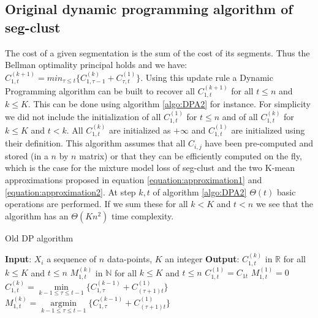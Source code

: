 \documentclass[article,10pt]{llncs}
\begin{document}

\subsection{Original dynamic programming algorithm of seg-clust}

The cost of a given segmentation is the sum of the cost of its segments. 
Thus the Bellman optimality principal holds and we have:
$ C_{1, t}^{(k+1)} = min_{\tau \leq t} \{ C_{1, \tau -1}^{(k)}  + C_{\tau, t}^{(1)} \} .$
Using this update rule  a Dynamic Programming algorithm can be built to recover all $ C_{1, t}^{(k+1)}$ for all $t \leq n$ and $k \leq K$.
This can be done using algorithm \ref{algo:DPA2} for instance. 
For simplicity we did not include the initialization of all $C^{(1)}_{1,t}$ for $t \leq n$ and of all $C^{(k)}_{1,t}$ for $k \leq K$ and $t < k$.
All $C^{(k)}_{1,t}$ are initialized as $+\infty$ and $C^{(1)}_{1,t}$ are initialized using their definition.
This algorithm assumes that all $C_{i, j}$ have been pre-computed and stored (in 
a $n$ by $n$ matrix) or that they can be efficiently computed on the fly, which is the case for the mixture model loss of seg-clust and the two K-mean approximations proposed in equation \ref{equation:approximation1} and \ref{equation:approximation2}. 
At step $k, t$ of algorithm \ref{algo:DPA2}  $\Theta(t)$ basic operations are performed. 
If we sum these for all $k < K$ and $t < n$  we see that the algorithm has an $\Theta(Kn^2)$ time complexity. 


\begin{algorithm}
  \caption{Old DP algorithm}\label{algo:DPA2}
  \begin{algorithmic}
    \State \textbf{Input}: $X_i$ a sequence of $n$ data-points, $K$ an integer
    \State \textbf{Output}: $C^{(k)}_{1,t}$ in $\mathbb{R}$ for all $k \leq K$ and $t \leq n$
    \State $M^{(k)}_{1,t}$ in $\mathbb{N}$ for all $k \leq K$ and $t \leq n$
         \State $C^{(1)}_{1,t} = C_{1t}$ 
         \State $M^{(1)}_{1,t} = 0$  
    \EndFor
     	\State $C^{(k)}_{1,t} = \underset{k-1 \leq \tau \leq t-1}{\min} \{ C^{(k-1)}_{1,\tau}+ C_{(\tau+1)t}^{(1)} \}$ 
        \State $M^{(k)}_{1,t} =\underset{k-1 \leq \tau \leq t-1}{\operatorname{argmin}} \{ C^{(k-1)}_{1,\tau}+ C_{(\tau+1)t}^{(1)} \}$ 
        \EndFor
   
     \EndFor
  \end{algorithmic}
\end{algorithm}
\end{document}
